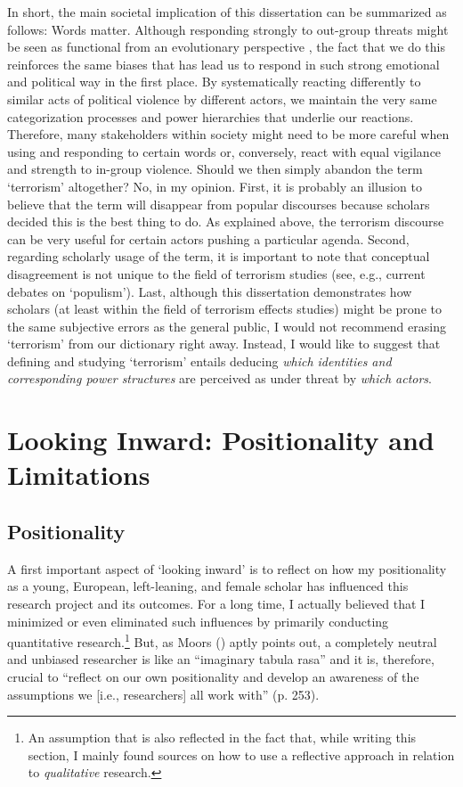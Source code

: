 In short, the main societal implication of this dissertation can be summarized as follows: Words matter. Although responding strongly to out-group threats might be seen as functional from an evolutionary perspective \citep{Tooby2010, Lindner2018}, the fact that we do this reinforces the same biases that has lead us to respond in such strong emotional and political way in the first place. By systematically reacting differently to similar acts of political violence by different actors, we maintain the very same categorization processes and power hierarchies that underlie our reactions. Therefore, many stakeholders within society might need to be more careful when using and responding to certain words or, conversely, react with equal vigilance and strength to in-group violence. Should we then simply abandon the term `terrorism' altogether? No, in my opinion. First, it is probably an illusion to believe that the term will disappear from popular discourses because scholars decided this is the best thing to do. As explained above, the terrorism discourse can be very useful for certain actors pushing a particular agenda. Second, regarding scholarly usage of the term, it is important to note that conceptual disagreement is not unique to the field of terrorism studies (see, e.g., current debates on `populism'). Last, although this dissertation demonstrates how scholars (at least within the field of terrorism effects studies) might be prone to the same subjective errors as the general public, I would not recommend erasing `terrorism' from our dictionary right away. Instead, I would like to suggest that defining and studying `terrorism' entails deducing \textit{which identities and corresponding power structures} are perceived as under threat by \textit{which actors}.


\newpage
\section{Looking Inward: Positionality and Limitations}
\label{sec:62}


\subsection{Positionality}
\label{sec:622}
A first important aspect of `looking inward' is to reflect on how my positionality as a young, European, left-leaning, and female scholar has influenced this research project and its outcomes. For a long time, I actually believed that I minimized or even eliminated such influences by primarily conducting quantitative research.\footnote{An assumption that is also reflected in the fact that, while writing this section, I mainly found sources on how to use a reflective approach in relation to \textit{qualitative} research.} But, as Moors (\citeyear{Moors2019}) aptly points out, a completely neutral and unbiased researcher is like an ``imaginary tabula rasa'' and it is, therefore, crucial to ``reflect on our own positionality and develop an awareness of the assumptions we [i.e., researchers] all work with'' (p. 253). 



